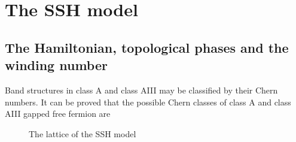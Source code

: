 \documentclass[hyperref, a4paper]{article}
\begin{document}
\section{The SSH model}

\subsection{The Hamiltonian, topological phases and the winding number}

Band structures in class A and class AIII may be classified by their Chern numbers. It can be proved that 
the possible Chern classes of class A and class AIII gapped free fermion are 

\begin{figure}
    \centering
    
    \caption{The lattice of the SSH model}
    \label{fig:ssh-lattice}
\end{figure}
\end{document}
